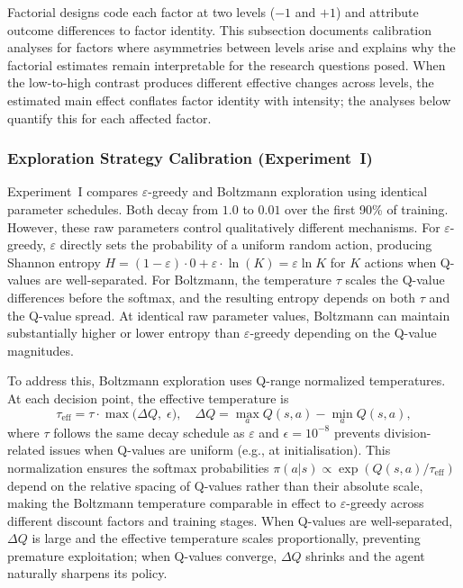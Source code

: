 Factorial designs code each factor at two levels ($-1$ and $+1$) and attribute outcome differences to factor identity. This subsection documents calibration analyses for factors where asymmetries between levels arise and explains why the factorial estimates remain interpretable for the research questions posed. When the low-to-high contrast produces different effective changes across levels, the estimated main effect conflates factor identity with intensity; the analyses below quantify this for each affected factor.

\subsubsection{Exploration Strategy Calibration (Experiment~I)}

Experiment~I compares $\varepsilon$-greedy and Boltzmann exploration using identical parameter schedules. Both decay from $1.0$ to $0.01$ over the first 90\% of training. However, these raw parameters control qualitatively different mechanisms. For $\varepsilon$-greedy, $\varepsilon$ directly sets the probability of a uniform random action, producing Shannon entropy $H = (1-\varepsilon)\cdot 0 + \varepsilon \cdot \ln(K) = \varepsilon \ln K$ for $K$ actions when Q-values are well-separated. For Boltzmann, the temperature $\tau$ scales the Q-value differences before the softmax, and the resulting entropy depends on both $\tau$ and the Q-value spread. At identical raw parameter values, Boltzmann can maintain substantially higher or lower entropy than $\varepsilon$-greedy depending on the Q-value magnitudes.

To address this, Boltzmann exploration uses Q-range normalized temperatures. At each decision point, the effective temperature is
\[
  \tau_{\text{eff}} = \tau \cdot \max\bigl(\Delta Q,\; \epsilon\bigr), \quad \Delta Q = \max_a Q(s,a) - \min_a Q(s,a),
\]
where $\tau$ follows the same decay schedule as $\varepsilon$ and $\epsilon = 10^{-8}$ prevents division-related issues when Q-values are uniform (e.g., at initialisation). This normalization ensures the softmax probabilities $\pi(a|s) \propto \exp(Q(s,a)/\tau_{\text{eff}})$ depend on the relative spacing of Q-values rather than their absolute scale, making the Boltzmann temperature comparable in effect to $\varepsilon$-greedy across different discount factors and training stages. When Q-values are well-separated, $\Delta Q$ is large and the effective temperature scales proportionally, preventing premature exploitation; when Q-values converge, $\Delta Q$ shrinks and the agent naturally sharpens its policy.

